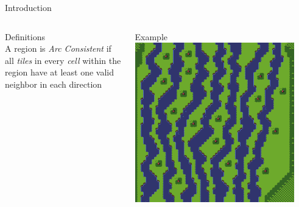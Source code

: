 \documentclass{beamer}
\begin{document}
  \begin{frame}[fragile]{Introduction}
    \begin{columns}[T,onlytextwidth]
        \begin{block}{Definitions}
          \hfill \\

          A region is \textit{Arc Consistent} if all \textit{tiles} in every \textit{cell} within the region have at least
          one valid neighbor in each direction


        \end{block}
        \begin{block}{Example}
          \includegraphics[width=0.9\textwidth]{img/forestmicro_64x64.pdf}
        \end{block}
    \end{columns}
  \end{frame}
\end{document}
